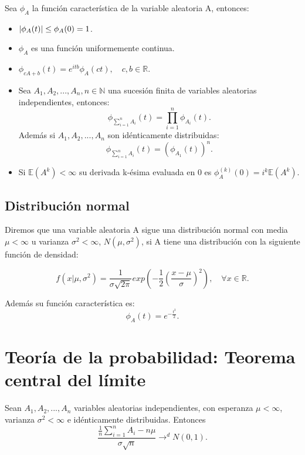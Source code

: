 \documentclass[../proyecto.tex]{memoir}
\begin{document}
\begin{prop}
Sea $\phi_A$ la función característica de la variable aleatoria A, entonces:

\begin{itemize}
\item $\abs{\phi_A(t)} \leq \phi_A(0)=1$.
\item $\phi_A$ es una función uniformemente continua.
\item $\phi_{cA+b}(t)=e^{itb}\phi_A(ct), \quad c,b\in \mathds{R}$.
\item Sea $A_1, A_2,...,A_n, n\in\mathds{N}$ una sucesión finita de variables aleatorias independientes, entonces: $$ 
\phi_{\sum^{n}_{i=1} A_i} (t) = \prod_{i=1}^{n} \phi_{A_i} (t) .
$$ Además si $A_1, A_2,...,A_n$ son idénticamente distribuidas: $$
\phi_{\sum^{n}_{i=1} A_i} (t) = \left( \phi_{A_1}(t) \right)^{n}.
$$
\item Si $\mathds{E}(A^k) < \infty$ su derivada k-ésima evaluada en 0 es $\phi_A^{(k)}(0)=i^k\mathds{E}(A^k)$.
\end{itemize}

\end{prop}

\subsection{Distribución normal}

\begin{defi} \label{normal}
Diremos que una variable aleatoria A sigue una distribución normal con media $\mu < \infty$ u varianza $\sigma^2 < \infty$, $N(\mu,\sigma^2)$, si A tiene una distribución con la siguiente función de densidad: 

$$
f(x| \mu, \sigma^2) = \frac{1}{ \sigma \sqrt{ 2 \pi }} exp \left( -\frac{1}{2}\left( \frac{x-\mu}{\sigma} \right)^2 \right),\quad \forall x \in \mathds{R}.
$$

Además su función característica es: $$
 \phi_{A}(t)=e^{-\frac{t^2}{2}}.
$$
\end{defi}

\section{Teoría de la probabilidad: Teorema central del límite}

\begin{teorema} \label{central}
Sean $A_{1},A_{2},...,A_{n}$ variables aleatorias independientes, con esperanza $\mu < \infty$, varianza $\sigma^2 < \infty$ e idénticamente distribuidas. Entonces $$
\frac{ \frac{1}{n}\sum_{i=1}^nA_i - n\mu}{ \sigma \sqrt{n}} \to^d N(0,1).
$$
\end{teorema}
\end{document}
